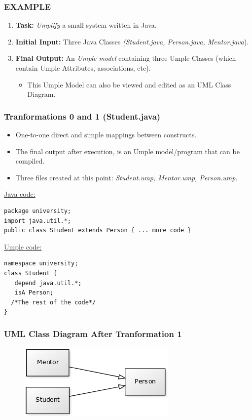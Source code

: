 \documentclass[xcolor=table]{beamer}
\begin{document}
\begin{frame}[fragile] 
\frametitle{EXAMPLE}
\begin{enumerate}
    \item \textbf{Task:}  \emph{Umplify} a small system written in Java.
    \item \textbf{Initial Input:} Three Java Classes  \emph{(Student.java, Person.java, Mentor.java}).
    \item \textbf{Final Output:} An \emph{Umple model} containing three Umple Classes (which contain Umple Attributes, associations, etc).
	\begin{itemize}
	   \item This Umple Model can also be viewed and edited as an UML Class Diagram.
	\end{itemize}
\end{enumerate}

\end{frame}

\begin{frame}[fragile] 
\frametitle{Tranformations 0 and 1 (Student.java)}
\begin{itemize}
  \item One-to-one direct and simple mappings between constructs.
  \item The final output after execution, is an Umple model/program that can be compiled.
  \item Three files created at this point:  \emph{Student.ump, Mentor.ump, Person.ump}. 
\end{itemize}
\underline{Java code:}
\begin{lstlisting}[style=JavaStyle]
package university;
import java.util.*;
public class Student extends Person { ... more code }
\end{lstlisting}
\underline{Umple code:}
\begin{lstlisting}[style=UmpleInStyle]
namespace university;
class Student { 
   depend java.util.*;
   isA Person;
  /*The rest of the code*/
}
\end{lstlisting}

\end{frame}

\begin{frame}
\frametitle{UML Class Diagram After Tranformation 1}
\begin{figure}
\includegraphics[width=0.8\linewidth]{Figures/uml1.png}
\end{figure}
\end{frame}
\end{document}
